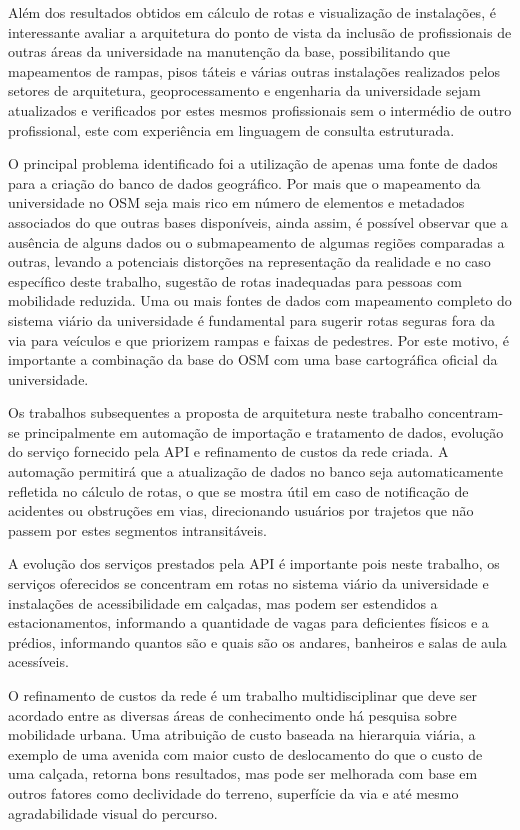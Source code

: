 \documentclass[oneside,openright,12pt]{ufsm_2015} %
\begin{document}
Além dos resultados obtidos em cálculo de rotas e visualização de instalações, é interessante avaliar a arquitetura do ponto de vista da inclusão de profissionais de outras áreas da universidade na manutenção da base, possibilitando que mapeamentos de rampas, pisos táteis e várias outras instalações realizados pelos setores de arquitetura, geoprocessamento e engenharia da universidade sejam atualizados e verificados por estes mesmos profissionais sem o intermédio de outro profissional, este com experiência em linguagem de consulta estruturada.

O principal problema identificado foi a utilização de apenas uma fonte de dados para a criação do banco de dados geográfico. Por mais que o mapeamento da universidade no OSM seja mais rico em número de elementos e metadados associados do que outras bases disponíveis, ainda assim, é possível observar que a ausência de alguns dados ou o submapeamento de algumas regiões comparadas a outras, levando a potenciais distorções na representação da realidade e no caso específico deste trabalho, sugestão de rotas inadequadas para pessoas com mobilidade reduzida. Uma ou mais fontes de dados com mapeamento completo do sistema viário da universidade é fundamental para sugerir rotas seguras fora da via para veículos e que priorizem rampas e faixas de pedestres. Por este motivo, é importante a combinação da base do OSM com uma base cartográfica oficial da universidade.

Os trabalhos subsequentes a proposta de arquitetura neste trabalho concentram-se principalmente em automação de importação e tratamento de dados, evolução do serviço fornecido pela API e refinamento de custos da rede criada. A automação permitirá que a atualização de dados no banco seja automaticamente refletida no cálculo de rotas, o que se mostra útil em caso de notificação de acidentes ou obstruções em vias, direcionando usuários por trajetos que não passem por estes segmentos intransitáveis.

A evolução dos serviços prestados pela API é importante pois neste trabalho, os serviços oferecidos se concentram em rotas no sistema viário da universidade e instalações de acessibilidade em calçadas, mas podem ser estendidos a estacionamentos, informando a quantidade de vagas para deficientes físicos e a prédios, informando quantos são e quais são os andares, banheiros e salas de aula acessíveis.

O refinamento de custos da rede é um trabalho multidisciplinar que deve ser acordado entre as diversas áreas de conhecimento onde há pesquisa sobre mobilidade urbana. Uma atribuição de custo baseada na hierarquia viária, a exemplo de uma avenida com maior custo de deslocamento do que o custo de uma calçada, retorna bons resultados, mas pode ser melhorada com base em outros fatores como declividade do terreno, superfície da via e até mesmo agradabilidade visual do percurso.
\end{document}
